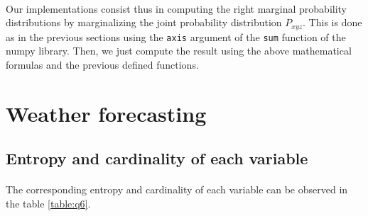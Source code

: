 \documentclass[a4paper, 11pt, oneside]{article}
\begin{document}
\paragraph{}Our implementations consist thus in computing the right marginal probability distributions by marginalizing the joint probability distribution $P_{xyz}$. This is done as in the previous sections using the \texttt{axis} argument of the \texttt{sum} function of the numpy library. Then, we just compute the result using the above mathematical formulas and the previous defined functions.

\section{Weather forecasting}

\subsection{Entropy and cardinality of each variable}

\paragraph{}The corresponding entropy and cardinality of each variable can be observed in the table \ref{table:q6}.
\end{document}
